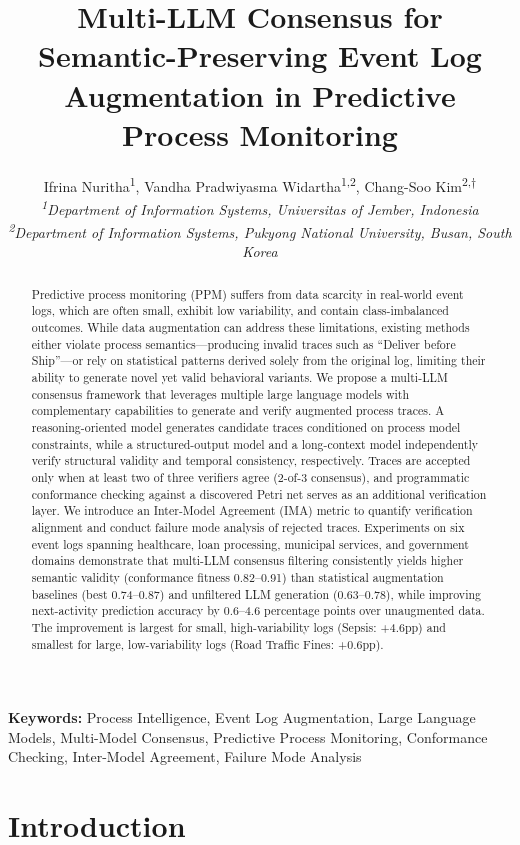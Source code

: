 \documentclass[11pt,a4paper]{article}
\title{Multi-LLM Consensus for Semantic-Preserving Event Log Augmentation in Predictive Process Monitoring}
\author{Ifrina Nuritha\textsuperscript{1}, Vandha Pradwiyasma Widartha\textsuperscript{1,2}, Chang-Soo Kim\textsuperscript{2,$\dagger$}\\
\textit{\textsuperscript{1}Department of Information Systems, Universitas of Jember, Indonesia}\\
\textit{\textsuperscript{2}Department of Information Systems, Pukyong National University, Busan, South Korea}}
\date{}
\newenvironment{keywords}{\par\noindent\textbf{Keywords: }}{\par}
\begin{document}
\maketitle

\begin{abstract}
Predictive process monitoring (PPM) suffers from data scarcity in real-world event logs, which are often small, exhibit low variability, and contain class-imbalanced outcomes. While data augmentation can address these limitations, existing methods either violate process semantics---producing invalid traces such as ``Deliver before Ship''---or rely on statistical patterns derived solely from the original log, limiting their ability to generate novel yet valid behavioral variants. We propose a multi-LLM consensus framework that leverages multiple large language models with complementary capabilities to generate and verify augmented process traces. A reasoning-oriented model generates candidate traces conditioned on process model constraints, while a structured-output model and a long-context model independently verify structural validity and temporal consistency, respectively. Traces are accepted only when at least two of three verifiers agree (2-of-3 consensus), and programmatic conformance checking against a discovered Petri net serves as an additional verification layer. We introduce an Inter-Model Agreement (IMA) metric to quantify verification alignment and conduct failure mode analysis of rejected traces. Experiments on six event logs spanning healthcare, loan processing, municipal services, and government domains demonstrate that multi-LLM consensus filtering consistently yields higher semantic validity (conformance fitness 0.82--0.91) than statistical augmentation baselines (best 0.74--0.87) and unfiltered LLM generation (0.63--0.78), while improving next-activity prediction accuracy by 0.6--4.6 percentage points over unaugmented data. The improvement is largest for small, high-variability logs (Sepsis: +4.6pp) and smallest for large, low-variability logs (Road Traffic Fines: +0.6pp).
\end{abstract}

\begin{keywords}
Process Intelligence, Event Log Augmentation, Large Language Models, Multi-Model Consensus, Predictive Process Monitoring, Conformance Checking, Inter-Model Agreement, Failure Mode Analysis
\end{keywords}

\section{Introduction}
\end{document}
